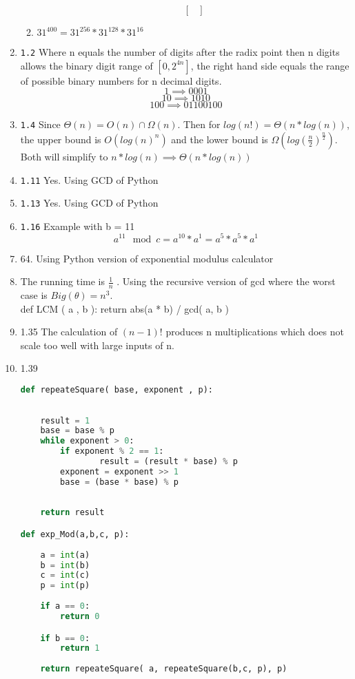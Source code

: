 \documentclass[12pt]{article}
\begin{document}
\begin{enumerate}
\begin{enumerate}
\[\begin{bmatrix}
\end{bmatrix} 
\]
\item $31^{400} = 31^{256} * 31^{128} * 31^{16}$
	\end{enumerate}

\item \texttt{1.2} Where n equals the number of digits after the radix point then n digits allows the binary digit range of $ [0, 2^{4n}]$, the right hand side equals the range of possible binary numbers for n decimal digits. \[1 \implies 0001\] \[10 \implies 1010\] \[100 \implies 0110 0100\]

\item \texttt{1.4} Since $\Theta(n) = O(n) \cap \Omega(n)$. Then for $log(n!) = \Theta(n* log(n))$, the upper bound is $O(log(n)^n)$ and the lower bound is $\Omega( log(\frac{n}{2})^\frac{n}{2} )$. Both will simplify to $n*log(n) \implies \Theta(n* log(n))$

\item \texttt{1.11} Yes. Using GCD of Python
\item \texttt{1.13} Yes. Using GCD of Python
\item \texttt{1.16} Example with b = 11 \[a^{11}\mod c 
=
a^{10} * a^{1}
= a^5 * a^5 * a^1
\]
\item 64. Using Python version of exponential modulus calculator
\item The running time is $\frac{1}{n}$ . Using the recursive version of gcd where the worst case is $Big (\theta) = n^3$. \\  def LCM ( a , b ): return abs(a * b) / gcd( a, b )
\item 1.35 The calculation of $(n-1)!$ produces n multiplications which does not scale too well with large inputs of n.
\item 1.39 
\begin{lstlisting}[language=Python]
def repeateSquare( base, exponent , p):
    
    
    result = 1
    base = base % p
    while exponent > 0:
        if exponent % 2 == 1:
                result = (result * base) % p
        exponent = exponent >> 1     
        base = (base * base) % p
     
     
    return result

def exp_Mod(a,b,c, p):
    
    a = int(a)
    b = int(b)
    c = int(c)
    p = int(p)
    
    if a == 0:
        return 0

    if b == 0:
        return 1
    
    return repeateSquare( a, repeateSquare(b,c, p), p)
    
\end{lstlisting}
\end{enumerate}
\end{document}
